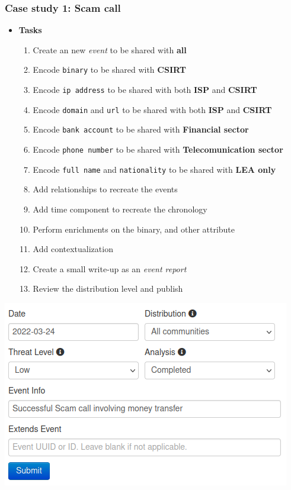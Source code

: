 \begin{frame}
    \frametitle{Case study 1: Scam call}
    \begin{itemize}
        \item[] \textbf{Tasks}
        \begin{enumerate}
            \item Create an new \textit{event} to be shared with \textbf{all}
            \item Encode \texttt{binary} to be shared with \textbf{CSIRT}
            \item Encode \texttt{ip address} to be shared with both \textbf{ISP} and \textbf{CSIRT}
            \item Encode \texttt{domain} and \texttt{url} to be shared with both \textbf{ISP} and \textbf{CSIRT}
            \item Encode \texttt{bank account} to be shared with \textbf{Financial sector}
            \item Encode \texttt{phone number} to be shared with \textbf{Telecomunication sector}
            \item Encode \texttt{full name} and \texttt{nationality} to be shared with \textbf{LEA only}
            \item Add relationships to recreate the events
            \item Add time component to recreate the chronology
            \item Perform enrichments on the binary, and other attribute
            \item Add contextualization
            \item Create a small write-up as an \textit{event report}
            \item Review the distribution level and publish
        \end{enumerate}
    \end{itemize}
\end{frame}

\begin{frame}
    \includegraphics[width=1.0\linewidth]{pictures/case1/event.png}
\end{frame}

